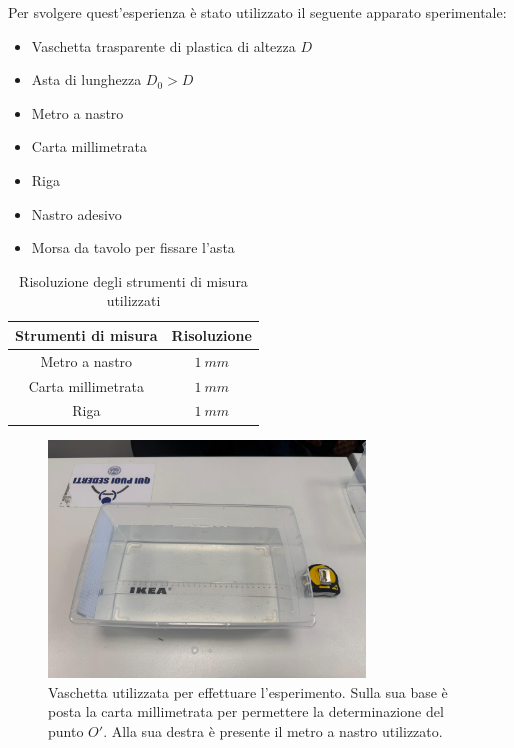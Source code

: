 Per svolgere quest'esperienza è stato utilizzato il seguente apparato sperimentale:
\begin{itemize}
	\item Vaschetta trasparente di plastica di altezza $D$
	\item Asta di lunghezza $D_0>D$
	\item Metro a nastro
	\item Carta millimetrata
	\item Riga
	\item Nastro adesivo
	\item Morsa da tavolo per fissare l'asta 
\end{itemize}


\begin{table}[H]
	\centering
	\begin{tabular}{|c|c|}
		\hline
		\textbf{Strumenti di misura} & \textbf{Risoluzione} \\
		\hline
		Metro a nastro & $1\ mm$ \\
		Carta millimetrata & $1\ mm$ \\
		Riga & $1\ mm$ \\
		\hline
	\end{tabular}
	\caption{Risoluzione degli strumenti di misura utilizzati}
	\label{tab:}
\end{table}


\begin{figure}[H]
	\centering
	\includegraphics[width=0.75\textwidth]{./figures/vaschettaemetro}
	\caption{Vaschetta utilizzata per effettuare l'esperimento. Sulla sua base è posta la carta millimetrata per permettere la determinazione del punto $O'$. Alla sua destra è presente il metro a nastro utilizzato.}
\end{figure}

